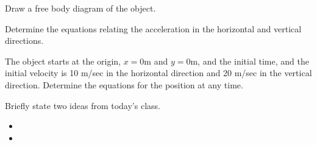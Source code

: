 \begin{problem}
\begin{subproblem}
    \item Draw a free body diagram of the object.
      \vfill

    \item Determine the equations relating the acceleration in the
      horizontal and vertical directions.

      \vfill

      \clearpage

    \item The object starts at the origin, $x=0$m and $y=0$m, and the
      initial time, and the initial velocity is 10 m/sec in the
      horizontal direction and 20 m/sec in the vertical
      direction. Determine the equations for the position at any time.

      \vfill

  \end{subproblem}

\end{problem}

\begin{problem}
\item 
  \begin{subproblem}
    \item
  \end{subproblem}
\end{problem}

\postClass

\begin{problem}
\item Briefly state two ideas from today's class.
  \begin{itemize}
  \item 
  \item 
  \end{itemize}
\item 
  \begin{subproblem}
    \item
  \end{subproblem}
\end{problem}
